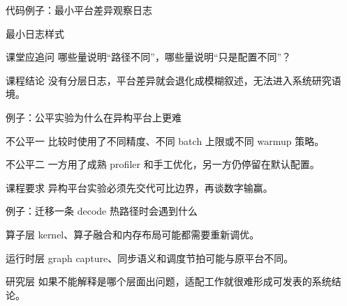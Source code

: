 \begin{frame}{代码例子：最小平台差异观察日志}
  \begin{block}{最小日志样式}
    {\ttfamily\small
    \par
    \par
    }
  \end{block}
  \pause
  \begin{block}{课堂应追问}
    哪些量说明“路径不同”，哪些量说明“只是配置不同”？
  \end{block}
  \pause
  \begin{block}{课程结论}
    没有分层日志，平台差异就会退化成模糊叙述，无法进入系统研究语境。
  \end{block}
\end{frame}

\begin{frame}{例子：公平实验为什么在异构平台上更难}
  \begin{block}{不公平一}
    比较时使用了不同精度、不同 batch 上限或不同 warmup 策略。
  \end{block}
  \pause
  \begin{block}{不公平二}
    一方用了成熟 profiler 和手工优化，另一方仍停留在默认配置。
  \end{block}
  \pause
  \begin{block}{课程要求}
    异构平台实验必须先交代可比边界，再谈数字输赢。
  \end{block}
\end{frame}

\begin{frame}{例子：迁移一条 decode 热路径时会遇到什么}
  \begin{block}{算子层}
    kernel、算子融合和内存布局可能都需要重新调优。
  \end{block}
  \pause
  \begin{block}{运行时层}
    graph capture、同步语义和调度节拍可能与原平台不同。
  \end{block}
  \pause
  \begin{block}{研究层}
    如果不能解释是哪个层面出问题，适配工作就很难形成可发表的系统结论。
  \end{block}
\end{frame}

